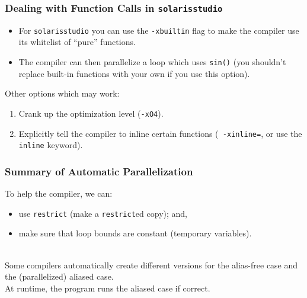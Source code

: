 \documentclass[aspectratio=43]{beamer}
\newenvironment{changemargin}[1]{%
  \begin{list}{}{%
    \setlength{\topsep}{0pt}%
    \setlength{\leftmargin}{#1}%
    \setlength{\rightmargin}{1em}
    \setlength{\listparindent}{\parindent}%
    \setlength{\itemindent}{\parindent}%
    \setlength{\parsep}{\parskip}%
  }%
  \item[]}{\end{list}}
\begin{document}
\begin{frame}
  \frametitle{Dealing with Function Calls in {\tt solarisstudio}}

\begin{changemargin}{1.5cm}  
  \begin{itemize}
    \item For {\tt solarisstudio} you can use the {\tt -xbuiltin} flag to make
      the compiler use its whitelist of ``pure'' functions.
    \item The compiler can then parallelize a loop which uses {\tt sin()}
      (you shouldn't replace built-in functions with your own if you use this
      option).
  \end{itemize}
  \vfill
  Other options which may work:
  
  \begin{enumerate}
    \item Crank up the optimization level ({\tt -xO4}).
    \item Explicitly tell the compiler to inline certain functions ({\tt
      -xinline=}, or use the {\tt inline} keyword).
  \end{enumerate}
\end{changemargin}
\end{frame}

\begin{frame}
  \frametitle{Summary of Automatic Parallelization}

\begin{changemargin}{1.5cm}  
To help the compiler, we can:
\begin{itemize}
\item use {\tt restrict} (make a {\tt restrict}ed copy); and,
\item make sure that loop bounds are constant (temporary
variables). 
\end{itemize}
~\\
Some compilers automatically create different versions
for the alias-free case and the (parallelized) aliased case.\\[1em]

At runtime, the program runs the aliased case if correct.
\end{changemargin}
\end{frame}
\end{document}
